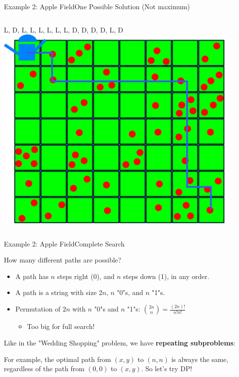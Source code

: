 \begin{frame}{Example 2: Apple Field}{One Possible Solution (Not maximum)}

  \begin{columns}
    L, D, L, L, L, L, L, L, D, D, D, D, L, D
    \includegraphics[width=0.9\textwidth]{../img/applefield-solution}
  \end{columns}
\end{frame}

\begin{frame}{Example 2: Apple Field}{Complete Search}

  \begin{block}{}
    How many different paths are possible?
  \end{block}
  \begin{itemize}
    \item A path has $n$ steps right (0), and $n$ steps down (1), in any order.
    \bigskip

    \item A path is a string with size $2n$, $n$ "0"s, and $n$ "1"s.
    \bigskip

    \item Permutation of $2n$ with $n$ "0"s and $n$ "1"s: $\binom{2n}{n} = \frac{(2n)!}{n!n!}$
    \begin{itemize}
      \item Too big for full search!
    \end{itemize}
  \end{itemize}\bigskip

  Like in the "Wedding Shopping" problem, we have {\bf repeating subproblems}:
  \medskip

  For example, the optimal path from $(x,y)$ to $(n,n)$ is always the same, regardless of the path from $(0,0)$ to $(x,y)$. So let's try DP!
\end{frame}


